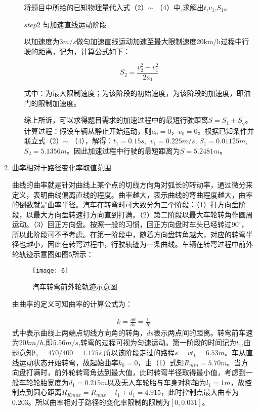 \documentclass{MathorCupmodeling}
\begin{document}
\begin{enumerate}
\begin{itemize}
				  将题目中所给的已知物理量代入式（2）$\sim$ （4）中,求解出$t$,$v_1$,$S_1$。
				  \item [$step2$]匀加速直线运动阶段
				  
				  以加速度为$3 m/s$做匀加速直线运动加速至最大限制速度20km/h过程中行驶的距离，记为，计算公式如下：
				  
				  \begin{equation}
					S_2=\frac{v_2^2-v_1^2}{2a_1}
				  \end{equation}
				 
				  式中：为最大限制速度；为该阶段的初始速度，为该阶段的加速度，即油门的限制加速度。


				  综上所诉，可以求得题目需求的加速过程中的最短行驶距离$S={S_1+S}_2$。计算过程：假设车辆从静止开始运动，则$a_0=0$，$v_0=0$。根据已知条件并联立式（2）$\sim$ （4），解得：$t_1=0.15s$, ${\ v}_1=0.225m/s$, $S_1 =0.01125m$, $S_2=5.1356m$。因此加速过程中行驶的最短距离为$S=5.2481m$。

			  \end{itemize}
		\item 曲率相对于路径变化率取值范围
	
		曲线的曲率就是针对曲线上某个点的切线方向角对弧长的转动率，通过微分来定义，表明曲线偏离直线的程度。曲率越大，表示曲线的弯曲程度越大，曲率的倒数就是曲率半径。汽车在转弯时可大致分为三个阶段：（1）打方向盘阶段，以最大方向盘转速打方向直到打满。（2）第二阶段以最大车轮转角作圆周运动。（3）回正方向盘。按照一般的习惯，回正方向盘时车头已经转过$90^{\circ}$，所以此阶段可不予考虑。在第一阶段中，随着方向盘转角越大，对应的转弯半径也越小，因此在转弯过程中，行驶轨迹为一条曲线。车辆在转弯过程中前外轮轨迹示意图如图5所示：
		\begin{figure}[h]
			\centering
			\texttt{[image: 6]}
			\caption{汽车转弯前外轮轨迹示意图}
			\label{fig:circuit-diagram}
		\end{figure}
		
		由曲率的定义可知曲率的计算公式为：

		\begin{eqnarray}
			k=\frac{d\theta}{ds}=\frac{1}{R}
		\end{eqnarray}
		式中表示曲线上两端点切线方向角的转角，$ds$表示两点间的距离。转弯前车速为$20km/h$,即$5.56m/s$,转弯的过程可视为匀速运动。第一阶段的时间记为$t_1$,由题意知$t_1=470/400 =1.175s$,所以该阶段走过的路程$s=vt_1=6.53m$。车从直线运动状态开始转弯，故起始曲率$k_0=0$，由（1）式知$R_{min}=5.70m$。当方向盘打满时，前外轮转弯角达到最大值，此时转弯半径取得最小值，考虑到一般车轮轮胎宽度为$d_1=0.215m$以及无人车轮胎与车身对称轴为$l_1=1m$，故控制点到圆心距离$R_{Kmax}=R_{max}-l_1+d_1=4.915$，此时控制点最大曲率为0.203。所以曲率相对于路径的变化率限制的限制为$[0,0.031]$。
	\end{enumerate}
\end{document}
